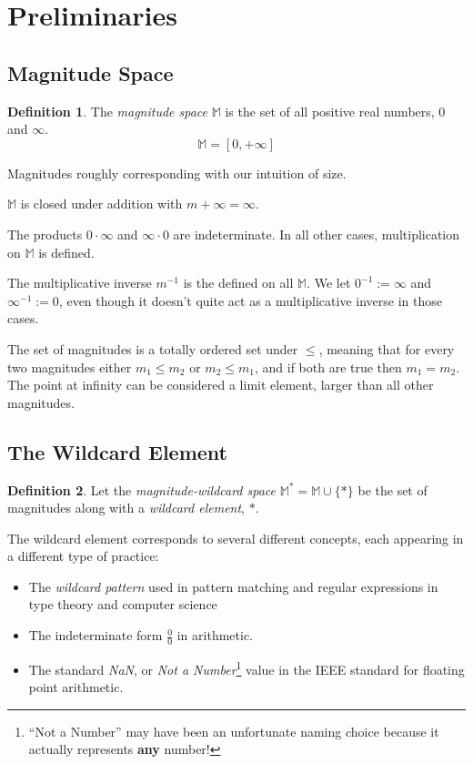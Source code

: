 \documentclass[twoside]{article}
\newcommand{\quotes}[1]{``#1''}
\theoremstyle{plain}%
\theoremstyle{definition}
\newtheorem{definition}{Definition}[section]
\theoremstyle{remark}
\begin{document}
\section{Preliminaries}
\subsection{Magnitude Space}
\begin{definition}
The \textit{magnitude space} \(\mathbb{M}\) is the set of all positive real numbers, \(0\) and \(\infty\).
\[\mathbb{M} = [0, +\infty]\]
\end{definition}

Magnitudes roughly corresponding with our intuition of size.

\(\mathbb{M}\) is closed under addition with \(m + \infty = \infty\).

The products \(0 \cdot \infty\) and \(\infty \cdot 0\) are indeterminate. In all other cases, multiplication on \(\mathbb{M}\) is defined.

The multiplicative inverse \(m^{-1}\) is the defined on all \(\mathbb{M}\). We let \(0^{-1} := \infty\) and \(\infty^{-1} := 0\), even though it doesn't quite act as a multiplicative inverse in those cases.

The set of magnitudes is a totally ordered set under \(\leq\), meaning that for every two magnitudes either \(m_1 \leq m_2\) or \(m_2 \leq m_1\), and if both are true then \(m_1 = m_2\). The point at infinity can be considered a limit element, larger than all other magnitudes.

\subsection{The Wildcard Element}

\begin{definition}
Let the \textit{magnitude-wildcard space} \(\mathbb{M}^*= \mathbb{M} \cup \{\ast\}\) be the set of magnitudes along with a \textit{wildcard element}, \(\ast\).
\end{definition}

The wildcard element corresponds to several different concepts, each appearing in a different type of practice:
\begin{itemize}
  \item The \textit{wildcard pattern} used in pattern matching and regular expressions in type theory and computer science
  \item The indeterminate form \(\frac{0}{0}\) in arithmetic.
  \item The standard \textit{NaN}, or \textit{Not a Number}\footnote{\quotes{Not a Number} may have been an unfortunate naming choice because it actually represents \textbf{any} number!} value in the IEEE standard for floating point arithmetic\cite{ieee}.
\end{itemize}
\end{document}
